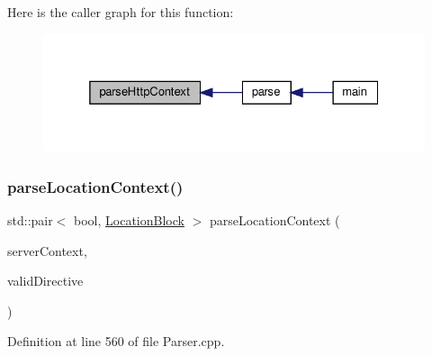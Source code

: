 Here is the caller graph for this function\+:
\nopagebreak
\begin{figure}[H]
\begin{center}
\leavevmode
\includegraphics[width=325pt]{classft_1_1_parser_a17a213759b2cca8e91ca225b2e86739d_icgraph}
\end{center}
\end{figure}
\mbox{\label{classft_1_1_parser_a4eb83702cdd8772017f71dda995c4089}} 
\subsubsection{\texorpdfstring{parse\+Location\+Context()}{parseLocationContext()}}
{\footnotesize\ttfamily std\+::pair$<$ bool, \hyperlink{classft_1_1_location_block}{Location\+Block} $>$ parse\+Location\+Context (\begin{DoxyParamCaption}\item[{\hyperlink{classft_1_1_server_block}{Server\+Block} \&}]{server\+Context,  }\item[{std\+::pair$<$ bool, \hyperlink{classft_1_1_directive}{Directive} $>$}]{valid\+Directive }\end{DoxyParamCaption})}



Definition at line 560 of file Parser.\+cpp.



